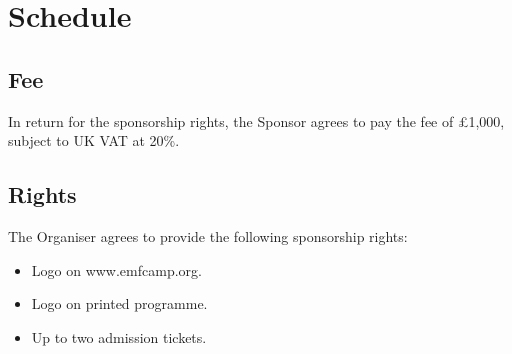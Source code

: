\section*{Schedule}

\subsection*{Fee}

In return for the sponsorship rights, the Sponsor agrees to pay the fee of £1,000, subject to UK VAT at 20\%.

\subsection*{Rights}

The Organiser agrees to provide the following sponsorship rights:

\begin{itemize}
    \item Logo on www.emfcamp.org.
    \item Logo on printed programme.
    \item Up to two admission tickets.
\end{itemize}
